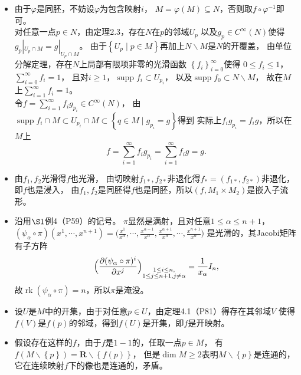 \begin{itemize}
    \item[17.]
    由于$\varphi$是同胚，不妨设$\varphi$为包含映射$i$，
    $M=\varphi (M)\subseteq N$，否则取$f\circ\varphi^{-1}$即可。
    \\
    对任意一点$p\in N$，由定理2.3，存在$N$在$p$的邻域$U_p$
    以及$g_p\in C^\infty(N)$使得$g_p|_{U_p\cap M}=g|_{U_p\cap M}$。
    由于$\left\{U_p\mid p\in M\right\}$再加上$N\backslash M$是$N$的开覆盖，
    由单位分解定理，存在$N$上局部有限项非零的光滑函数
    $\left\{f_i\right\}_{i=0}^\infty$使得
    $0\leq f_i\leq1$，$\sum\limits_{i=0}^\infty f_i=1$，
    且对$i\geq1$，$\operatorname{supp}f_i\subset U_{p_i}$，
    以及$\operatorname{supp}f_0\subset N\backslash M$，
    故在$M$上$\sum\limits_{i=1}^\infty f_i=1$。
    \\
    令$f=\sum\limits_{i=1}^\infty f_ig_{p_i}\in C^\infty(N)$，
    由$\operatorname{supp}f_i\cap M\subset U_{p_i}\cap M
    \subset\left\{q\in M\mid g_{p_i}=g\right\}$得到
    实际上$f_ig_{p_i}=f_ig$，所以在$M$上
    \[
    f=\sum\limits_{i=1}^\infty f_ig_{p_i}
    =\sum\limits_{i=1}^\infty f_ig=g.
    \]
    
    \item[18.]
    由$f_1,f_2$光滑得$f$也光滑，
    由切映射$f_{1*},f_{2*}$非退化得$f_*=(f_{1*},f_{2*})$非退化，
    即$f$也是浸入，
    由$f_1,f_2$是同胚得$f$也是同胚，所以$(f,M_1\times M_2)$是嵌入子流形。
    
    \item[19.]
    沿用$\S1$例4（P59）的记号。
    $\pi$显然是满射，且对任意$1\leq\alpha\leq n+1$，
    $(\psi_\alpha\circ\pi)(x^1,\cdots,x^{n+1})
    =\big(\frac{x^1}{x^\alpha},\cdots,\frac{x^{\alpha-1}}{x^\alpha},
    \frac{x^{\alpha+1}}{x^\alpha},\cdots,\frac{x^{n+1}}{x^\alpha}\big)$
    是光滑的，其Jacobi矩阵有子方阵
    \[
        \Big(\frac{\partial(\psi_\alpha\circ\pi)^i}
        {\partial x^j}\Big)_{\begin{subarray}{c}1\leq i\leq n,\\1\leq j\leq n+1, j\neq\alpha\end{subarray}}
        =\frac{1}{x_\alpha}I_n,
    \]
    故$\operatorname{rk}(\psi_\alpha\circ\pi)=n$，所以$\pi$是淹没。
    
    \item[20.]
    设$U$是$M$中的开集，由于对任意$p \in U$，由定理4.1（P81）得存在其邻域$V$
    使得$f(V)$是$f(p)$的邻域，得到$f(U)$是开集，即$f$是开映射。
    
    \item[21.]
    假设存在这样的$f$，由于$f$是$1-1$的，任取一点$p\in M$，
    有$f(M\backslash\left\{p\right\})=\mathbf{R}\backslash\left\{f(p)\right\}$，
    但是$\dim M\geq2$表明$M\backslash\left\{p\right\}$是连通的，
    它在连续映射$f$下的像也是连通的，矛盾。
    

\end{itemize}
